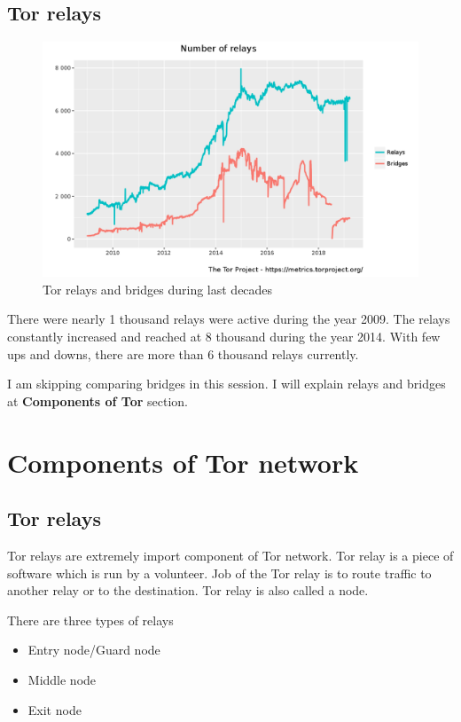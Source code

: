 \documentclass{article}
\begin{document}
  \subsection{Tor relays}
    \begin{figure}[h!]
      \includegraphics[width=\linewidth]{relays-and-bridges-in-last-decade.png}
      \caption{Tor relays and bridges during last decades}
      \label{fig:relays_and_bridges_during_last_decade}
    \end{figure}

    There were nearly 1 thousand relays were active during the year 2009. The
    relays constantly increased and reached at 8 thousand during the year 2014.
    With few ups and downs, there are more than 6 thousand relays currently.

    I am skipping comparing bridges in this session. I will explain relays and
    bridges at \textbf{Components of Tor} section.

  \section{Components of Tor network}

    \subsection{Tor relays}
      Tor relays are extremely import component of Tor network. Tor relay is a
      piece of software which is run by a volunteer. Job of the Tor relay is to
      route traffic to another relay or to the destination. Tor relay is also
      called a node.

      There are three types of relays

      \begin{itemize}
        \item{Entry node/Guard node}
        \item{Middle node}
        \item{Exit node}
      \end{itemize}
\end{document}
